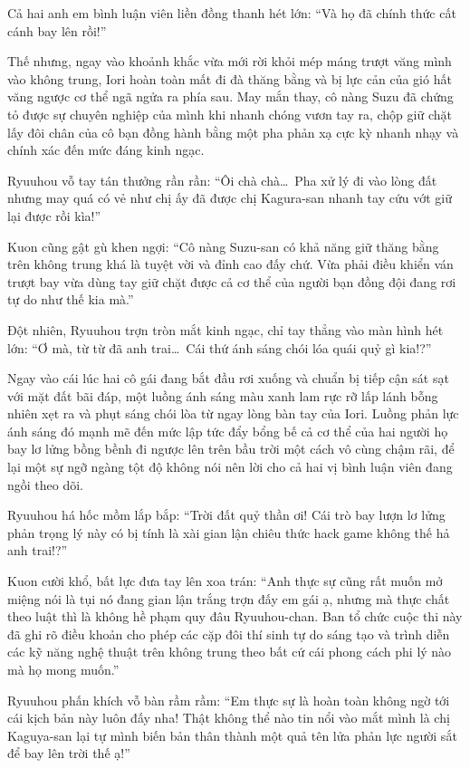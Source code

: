 \documentclass[../main.tex]{subfiles}
\begin{document}
Cả hai anh em bình luận viên liền đồng thanh hét lớn: ``Và họ đã chính thức cất cánh bay lên rồi!''

Thế nhưng, ngay vào khoảnh khắc vừa mới rời khỏi mép máng trượt văng mình vào không trung, Iori hoàn toàn mất đi đà thăng bằng và bị lực cản của gió hất văng ngược cơ thể ngã ngửa ra phía sau. May mắn thay, cô nàng Suzu đã chứng tỏ được sự chuyên nghiệp của mình khi nhanh chóng vươn tay ra, chộp giữ chặt lấy đôi chân của cô bạn đồng hành bằng một pha phản xạ cực kỳ nhanh nhạy và chính xác đến mức đáng kinh ngạc.

Ryuuhou vỗ tay tán thưởng rần rần: ``Ôi chà chà\dots\ Pha xử lý đi vào lòng đất nhưng may quá có vẻ như chị ấy đã được chị Kagura-san nhanh tay cứu vớt giữ lại được rồi kìa!''

Kuon cũng gật gù khen ngợi: ``Cô nàng Suzu-san có khả năng giữ thăng bằng trên không trung khá là tuyệt vời và đỉnh cao đấy chứ. Vừa phải điều khiển ván trượt bay vừa dùng tay giữ chặt được cả cơ thể của người bạn đồng đội đang rơi tự do như thế kia mà.''

Đột nhiên, Ryuuhou trợn tròn mắt kinh ngạc, chỉ tay thẳng vào màn hình hét lớn: ``Ơ mà, từ từ đã anh trai\dots\ Cái thứ ánh sáng chói lóa quái quỷ gì kia!?''

Ngay vào cái lúc hai cô gái đang bắt đầu rơi xuống và chuẩn bị tiếp cận sát sạt với mặt đất bãi đáp, một luồng ánh sáng màu xanh lam rực rỡ lấp lánh bỗng nhiên xẹt ra và phụt sáng chói lòa từ ngay lòng bàn tay của Iori. Luồng phản lực ánh sáng đó mạnh mẽ đến mức lập tức đẩy bổng bế cả cơ thể của hai người họ bay lơ lửng bồng bềnh đi ngược lên trên bầu trời một cách vô cùng chậm rãi, để lại một sự ngỡ ngàng tột độ không nói nên lời cho cả hai vị bình luận viên đang ngồi theo dõi.

Ryuuhou há hốc mồm lắp bắp: ``Trời đất quỷ thần ơi! Cái trò bay lượn lơ lửng phản trọng lý này có bị tính là xài gian lận chiêu thức hack game không thế hả anh trai!?''

Kuon cười khổ, bất lực đưa tay lên xoa trán: ``Anh thực sự cũng rất muốn mở miệng nói là tụi nó đang gian lận trắng trợn đấy em gái ạ, nhưng mà thực chất theo luật thì là không hề phạm quy đâu Ryuuhou-chan. Ban tổ chức cuộc thi này đã ghi rõ điều khoản cho phép các cặp đôi thí sinh tự do sáng tạo và trình diễn các kỹ năng nghệ thuật trên không trung theo bất cứ cái phong cách phi lý nào mà họ mong muốn.''

Ryuuhou phấn khích vỗ bàn rầm rầm: ``Em thực sự là hoàn toàn không ngờ tới cái kịch bản này luôn đấy nha! Thật không thể nào tin nổi vào mắt mình là chị Kaguya-san lại tự mình biến bản thân thành một quả tên lửa phản lực người sắt để bay lên trời thế ạ!''
\end{document}
